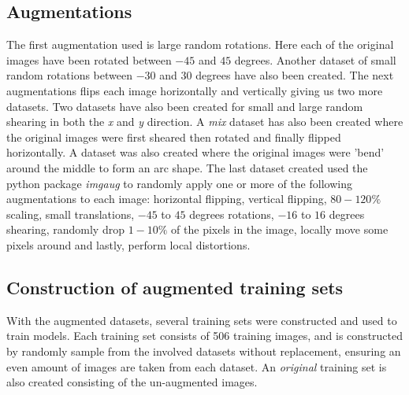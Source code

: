 \subsection{Augmentations}
The first augmentation used is large random rotations. Here each of the original images have been rotated between $-45$ and $45$ degrees. Another dataset of small random rotations between $-30$ and $30$ degrees have also been created. The next augmentations flips each image horizontally and vertically giving us two more datasets. Two datasets have also been created for small and large random shearing in both the \textit{x} and \textit{y} direction. A \textit{mix} dataset has also been created where the original images were first sheared then rotated and finally flipped horizontally. A dataset was also created where the original images were 'bend' around the middle to form an arc shape. The last dataset created used the python package \textit{imgaug} to randomly apply one or more of the following augmentations to each image: horizontal flipping, vertical flipping, $80-120\%$ scaling, small translations, $-45$ to $45$ degrees rotations, $-16$ to $16$ degrees shearing, randomly drop $1-10\%$ of the pixels in the image, locally move some pixels around and lastly, perform local distortions. 

\subsection{Construction of augmented training sets}\label{construction}
With the augmented datasets, several training sets were constructed and used to train models. Each training set consists of 506 training images, and is constructed by randomly sample from the involved datasets without replacement, ensuring an even amount of images are taken from each dataset. An \textit{original} training set is also created consisting of the un-augmented images.